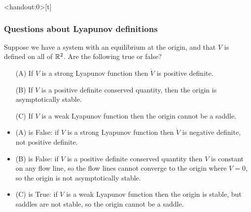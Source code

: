 \documentclass[9pt]{beamer}
\begin{document}
\begin{frame}<handout:0>[t]
 \frametitle{Questions about Lyapunov definitions}
 Suppose we have a system with an equilibrium at the origin, and that
 $V$ is defined on all of ${\mathbb{R}}^2$.  Are the following true or false?
 \begin{itemize}
  \item[(A)] If $V$ is a strong Lyapunov function then $\dot{V}$ is
   positive definite.
  \item[(B)] If $V$ is a positive definite conserved quantity, then
   the origin is asymptotically stable.
  \item[(C)] If $V$ is a weak Lyapunov function then the origin cannot
   be a saddle.
 \end{itemize}

 \bigskip

 \begin{itemize}
  \item<2-> (A) is False: if $V$ is a strong Lyapunov function then
   $\dot{V}$ is negative definite, not positive definite.
  \item<3-> (B) is False: if $V$ is a positive definite conserved
   quantity then $V$ is constant on any flow line, so the flow lines
   cannot converge to the origin where $V=0$, so the origin is not
   asymptotically stable.
  \item<4-> (C) is True: if $V$ is a weak Lyapunov function then the
   origin is stable, but saddles are not stable, so the origin cannot 
   be a saddle.
 \end{itemize}
\end{frame}
\end{document}
